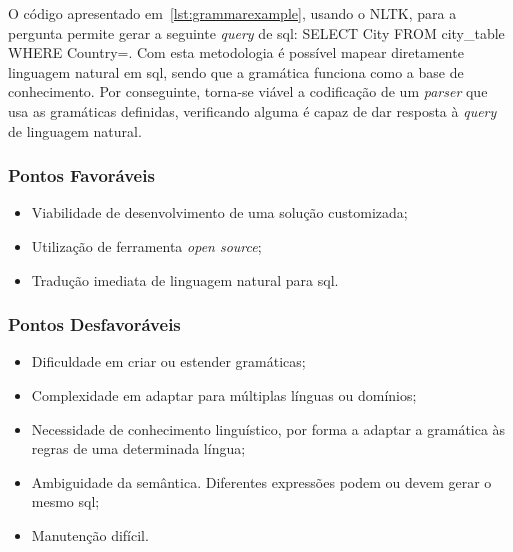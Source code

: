 O código apresentado em~\ref{lst:grammarexample}, usando o NLTK, para a pergunta  permite gerar a seguinte \textit{query} de \gls{sql}: SELECT City FROM city\_table WHERE Country=. Com esta metodologia é possível mapear diretamente linguagem natural em \gls{sql}, sendo que a gramática funciona como a base de conhecimento. Por conseguinte, torna-se viável a codificação de um \textit{parser} que usa as gramáticas definidas, verificando
alguma é capaz de dar resposta à \textit{query} de linguagem natural.

\subsubsection*{Pontos Favoráveis}
\begin{itemize}
    \item 
    {
        Viabilidade de desenvolvimento de uma solução customizada;
    }
    \item
    {
        Utilização de ferramenta \textit{open source};
    }
    \item 
    {
        Tradução imediata de linguagem natural para \gls{sql}. 
    }
\end{itemize}

\subsubsection*{Pontos Desfavoráveis}
\begin{itemize}
    \item 
    {
        Dificuldade em criar ou estender gramáticas;
    }
    \item
    {
        Complexidade em adaptar para múltiplas línguas ou domínios;
    }
    \item
    {
        Necessidade de conhecimento linguístico, por forma a adaptar a gramática às regras de uma determinada língua;
    }
    \item
    {
        Ambiguidade da semântica. Diferentes expressões podem ou devem gerar o mesmo \gls{sql};
    }
    \item
    {
        Manutenção difícil.
    }
\end{itemize}

